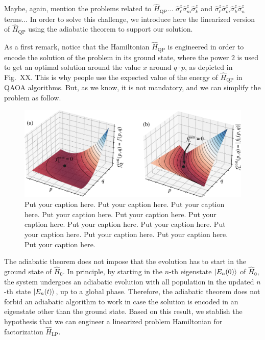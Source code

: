 {\color{red}Maybe, again, mention the problems related to $\hat{H}_{\mathrm{QP}}$... $\hat{\sigma}_{\ell}^{z} \hat{\sigma}_{m}^{z} \hat{\sigma}_{k}^{z}$ and $\hat{\sigma}_{\ell}^{z} \hat{\sigma}_{m}^{z} \hat{\sigma}_{k}^{z}\hat{\sigma}_{n}^{z}$ terms...} In order to solve this challenge, we introduce here the linearized version of $\hat{H}_{\mathrm{QP}}$ using the adiabatic theorem to support our solution.

As a first remark, notice that the Hamiltonian $\hat{H}_{\mathrm{QP}}$ is engineered in order to encode the solution of the problem in its ground state, where the power $2$ is used to get an optimal solution around the value $x$ around $q\cdot p$, as depicted in Fig.~XX. This is why people use the expected value of the energy of $\hat{H}_{\mathrm{QP}}$ in QAOA algorithms. But, as we know, it is not mandatory, and we can simplify the problem as follow. 

\begin{figure}[t!]
	\centering
	\includegraphics[width=0.9\linewidth]{figs/grafico_3d.pdf}
	\caption{Put your caption here. Put your caption here. Put your caption here. Put your caption here. Put your caption here. Put your caption here. Put your caption here. Put your caption here. Put your caption here. Put your caption here. Put your caption here. Put your caption here.}
	\label{Fig:Graph3D}
\end{figure}

The adiabatic theorem does not impose that the evolution has to start in the ground state of $\hat{H}_{0}$. In principle, by starting in the $n$-th eigenstate $\ket{E_{n}(0)}$ of $\hat{H}_{0}$, the system undergoes an adiabatic evolution with all population in the updated $n$-th state $\ket{E_{n}(t)}$, up to a global phase. Therefore, the adiabatic theorem does not forbid an adiabatic algorithm to work in case the solution is encoded in an eigenstate other than the ground state. Based on this result, we stablish the hypothesis that we can engineer a linearized problem Hamiltonian for factorization $\hat{H}_{\mathrm{LP}}$.

